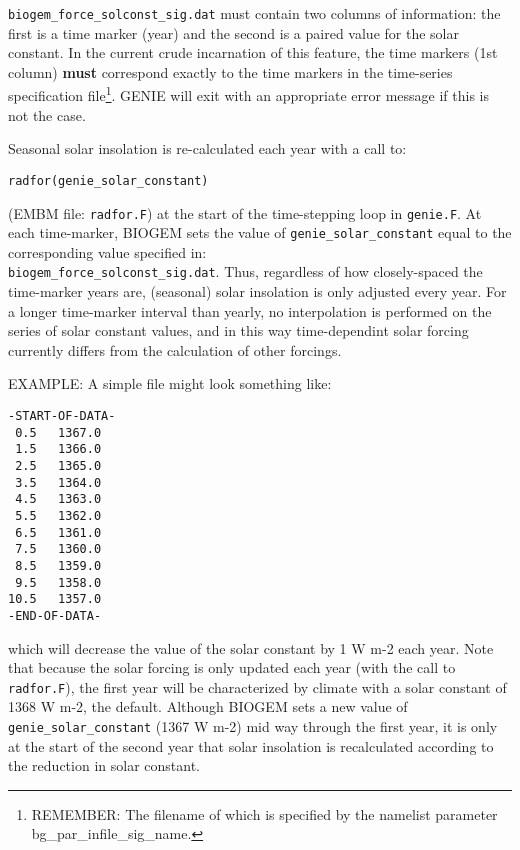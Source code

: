 \documentclass[10pt,twoside]{article}
\begin{document}
\texttt{biogem\_force\_solconst\_sig.dat} must contain two columns of information: the first is a time marker (year) and the second is a paired value for the solar constant. In the current crude incarnation of this feature, the time markers (1st column) \textbf{must} correspond exactly to the time markers in the time-series specification file\footnote{REMEMBER: The filename of which is specified by the namelist parameter bg\_par\_infile\_sig\_name.}. GENIE will exit with an appropriate error message if this is not the case.

Seasonal solar insolation is re-calculated each year with a call to:
\vspace{-10pt}\begin{verbatim}radfor(genie_solar_constant)\end{verbatim}\vspace{-5pt}
(EMBM file: \texttt{radfor.F}) at the start of the time-stepping loop in \texttt{genie.F}. At each time-marker, BIOGEM sets the value of \texttt{genie\_solar\_constant} equal to the corresponding value specified in:\\
\texttt{biogem\_force\_solconst\_sig.dat}. Thus, regardless of how closely-spaced the time-marker years are, (seasonal) solar insolation is only adjusted every year. For a longer time-marker interval than yearly, no interpolation is performed on the series of solar constant values, and in this way time-dependint solar forcing currently differs from the calculation of other forcings.

EXAMPLE: A simple file might look something like:
\vspace{-5pt}\begin{verbatim}
-START-OF-DATA-
 0.5   1367.0
 1.5   1366.0
 2.5   1365.0
 3.5   1364.0
 4.5   1363.0
 5.5   1362.0
 6.5   1361.0
 7.5   1360.0
 8.5   1359.0
 9.5   1358.0
10.5   1357.0
-END-OF-DATA-
\end{verbatim}\vspace{-5pt}
which will decrease the value of the solar constant by 1 W m-2 each year. Note that because the solar forcing is only updated each year (with the call to \texttt{radfor.F}), the first year will be characterized by climate with a solar constant of 1368 W m-2, the default. Although BIOGEM sets a new value of \texttt{genie\_solar\_constant} (1367 W m-2) mid way through the first year, it is only at the start of the second year that solar insolation is recalculated according to the reduction in solar constant.


\end{document}

